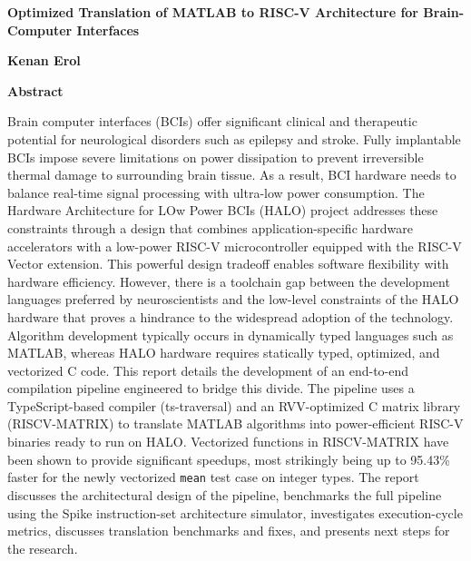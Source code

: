 \thispagestyle{plain}
\begin{center}
    \Large
    \textbf{Optimized Translation of MATLAB to RISC-V Architecture for Brain-Computer Interfaces}
    
    \vspace{0.4cm}
    \large
    
    \vspace{0.4cm}
    \textbf{Kenan Erol}
    
    \vspace{0.9cm}
    \textbf{Abstract}
\end{center}


Brain computer interfaces (BCIs) offer significant clinical and therapeutic potential for neurological disorders such as epilepsy and stroke. Fully implantable BCIs impose severe limitations on power dissipation to prevent irreversible thermal damage to surrounding brain tissue. As a result, BCI hardware needs to balance real-time signal processing with ultra-low power consumption. The Hardware Architecture for LOw Power BCIs (HALO) project addresses these constraints through a design that combines application-specific hardware accelerators with a low-power RISC-V microcontroller equipped with the RISC-V Vector extension. This powerful design tradeoff enables software flexibility with hardware efficiency. However, there is a toolchain gap between the development languages preferred by neuroscientists and the low-level constraints of the HALO hardware that proves a hindrance to the widespread adoption of the technology. Algorithm development typically occurs in dynamically typed languages such as MATLAB, whereas HALO hardware requires statically typed, optimized, and vectorized C code. This report details the development of an end-to-end compilation pipeline engineered to bridge this divide. The pipeline uses a TypeScript-based compiler (ts-traversal) and an RVV-optimized C matrix library (RISCV-MATRIX) to translate MATLAB algorithms into power-efficient RISC-V binaries ready to run on HALO. Vectorized functions in RISCV-MATRIX have been shown to provide significant speedups, most strikingly being up to 95.43\% faster for the newly vectorized \texttt{mean} test case on integer types. The report discusses the architectural design of the pipeline, benchmarks the full pipeline using the Spike instruction-set architecture simulator, investigates execution-cycle metrics, discusses translation benchmarks and fixes, and presents next steps for the research.



